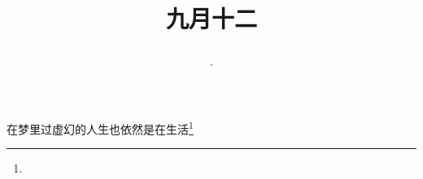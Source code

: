 \title{\date[d=14,m=10,y=2024][year:cn-y,年,month:cn,day:cn,日,·,weekday]·九月十二 }
在梦里过虚幻的人生也依然是在生活\footnote{ }

